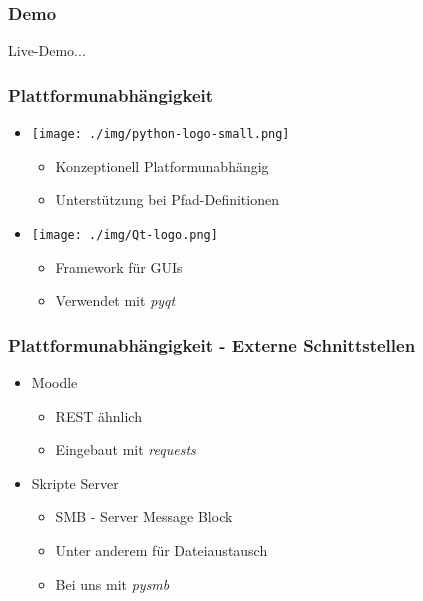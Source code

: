 \documentclass{beamer}
\begin{document}
	\begin{frame}
	\frametitle{Demo}
	Live-Demo...
	\end{frame}
	
	\begin{frame}
	\frametitle{Plattformunabhängigkeit}
	
	\begin{itemize}
	  \item
	    \texttt{[image: ./img/python-logo-small.png]}
	    \begin{itemize}
	      \item Konzeptionell Platformunabhängig
	      \item Unterstützung bei Pfad-Definitionen
	    \end{itemize}
	  \item
	    \texttt{[image: ./img/Qt-logo.png]}
	    \begin{itemize}
	      \item Framework für GUIs
	      \item Verwendet mit \emph{pyqt}
	    \end{itemize}
	\end{itemize}
	\end{frame}
	
	\begin{frame}
	\frametitle{Plattformunabhängigkeit - Externe Schnittstellen}
	
	\begin{itemize}
	  \item Moodle
	    \begin{itemize}
	      \item REST ähnlich
	      \item Eingebaut mit \emph{requests}
	    \end{itemize}
	  \item Skripte Server
	    \begin{itemize}
	      \item SMB - Server Message Block
	      \item Unter anderem für Dateiaustausch
	      \item Bei uns mit \emph{pysmb}
	    \end{itemize}
	\end{itemize}
	\end{frame}
	
\end{document}
